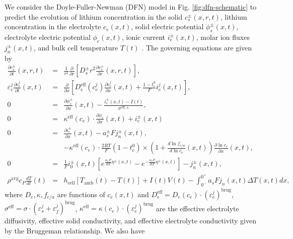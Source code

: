 \documentclass[12pt]{article}
\begin{document}
We consider the Doyle-Fuller-Newman (DFN) model in Fig. \ref{fig:dfn-schematic} to predict the evolution of lithium concentration in the solid $c_{s}^{\pm}(x,r,t)$, lithium concentration in the electrolyte $c_{e}(x,t)$, solid electric potential $\phi_{s}^{\pm}(x,t)$, electrolyte electric potential $\phi_{e}(x,t)$, ionic current $i_{e}^{\pm}(x,t)$, molar ion fluxes $j_{n}^{\pm}(x,t)$, and bulk cell temperature $T(t)$ \cite{Thomas2002}. The governing equations are given by
\begin{eqnarray}
	\frac{\partial c_{s}^{\pm}}{\partial t}(x,r,t) &=& \frac{1}{r^{2}} \frac{\partial}{\partial r} \left[ D_{s}^{\pm} r^{2} \frac{\partial c_{s}^{\pm}}{\partial r}(x,r,t) \right], \label{eqn:cs} \\
	 \varepsilon_{e}^{j} \frac{\partial c_{e}^{j}}{\partial t}(x,t) &=& \frac{\partial}{\partial x} \left[D_{e}^{\text{eff}}(c_{e}^{j}) \frac{\partial c_{e}^{j}}{\partial x}(x,t) + \frac{1 - t_{c}^{0}}{F} i_{e}^{j}(x,t) \right], \ \label{eqn:ce} \\
	0 &=& \frac{\partial \phi_{s}^{\pm}}{\partial x}(x,t) - \frac{i_{e}^{\pm}(x,t) - I(t)}{\sigma^{\text{eff},\pm}}, \label{eqn:phis} \\
	0 &=& \kappa^{\text{eff}}(c_{e}) \cdot \frac{\partial \phi_{e}}{\partial x}(x,t) + i_{e}^{\pm}(x,t) \nonumber \\
	0 &=& \frac{\partial i_{e}^{\pm}}{\partial x}(x,t) - a_{s}^{\pm} F j_{n}^{\pm}(x,t), \label{eqn:ie} \\
	&& - \kappa^{\text{eff}}(c_{e}) \cdot \frac{2RT}{F}(1 - t_{c}^{0}) \times \left(1 + \frac{d \ln f_{c/a}}{d \ln c_{e}}(x,t) \right) \frac{\partial \ln c_{e}}{\partial x}(x,t), \label{eqn:phie}  \quad \\
	0 &=& \frac{1}{F} i_{0}^{\pm}(x,t) \left[e^{\frac{\alpha_{a}F}{RT} \eta^{\pm}(x,t)} - e^{-\frac{\alpha_{c}F}{RT} \eta^{\pm}(x,t)} \right] - j_{n}^{\pm}(x,t), \label{eqn:bv} \\
	\rho^{\textrm{avg}} c_{P} \frac{dT}{dt}(t) &=& h_{\textrm{cell}} \left[ T_{\textrm{amb}}(t) - T(t) \right] + I(t) V(t) -\int_{0^{-}}^{0^{+}} a_{s} F j_{n}(x,t) \Delta T(x,t) dx, \label{eqn:T}
\end{eqnarray}
where $D_{e}, \kappa, f_{c/a}$ are functions of $c_{e}(x,t)$ and \noindent $D_{e}^{\text{eff}} = D_{e}(c_{e}) \cdot (\varepsilon_{e}^{j})^{\text{brug}}$, $\sigma^{\text{eff}} = \sigma \cdot (\varepsilon_{s}^{j} + \varepsilon_{f}^{j})^{\text{brug}}$, $\kappa^{\text{eff}} = \kappa(c_{e}) \cdot (\varepsilon_{e}^{j})^{\text{brug}}$ are the effective electrolyte diffusivity, effective solid conductivity, and effective electrolyte conductivity given by the Bruggeman relationship. We also have
\end{document}

